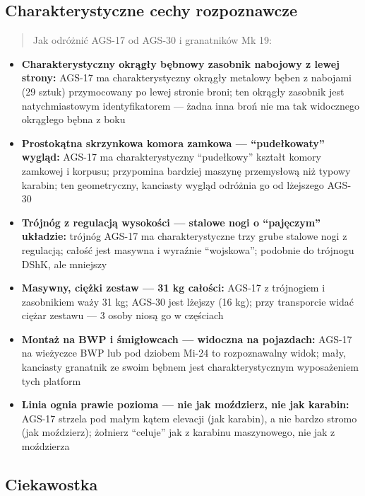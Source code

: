 \documentclass[12pt,oneside]{book}
\providecommand{\tightlist}{%
  \setlength{\itemsep}{0pt}\setlength{\parskip}{0pt}}
\begin{document}
\subsection{Charakterystyczne cechy
rozpoznawcze}\label{charakterystyczne-cechy-rozpoznawcze-97}

\begin{quote}
Jak odróżnić AGS-17 od AGS-30 i granatników Mk 19:
\end{quote}

\begin{itemize}
\tightlist
\item
  \textbf{Charakterystyczny okrągły bębnowy zasobnik nabojowy z lewej
  strony:} AGS-17 ma charakterystyczny okrągły metalowy bęben z nabojami
  (29 sztuk) przymocowany po lewej stronie broni; ten okrągły zasobnik
  jest natychmiastowym identyfikatorem --- żadna inna broń nie ma tak
  widocznego okrągłego bębna z boku
\item
  \textbf{Prostokątna skrzynkowa komora zamkowa --- ``pudełkowaty''
  wygląd:} AGS-17 ma charakterystyczny ``pudełkowy'' kształt komory
  zamkowej i korpusu; przypomina bardziej maszynę przemysłową niż typowy
  karabin; ten geometryczny, kanciasty wygląd odróżnia go od lżejszego
  AGS-30
\item
  \textbf{Trójnóg z regulacją wysokości --- stalowe nogi o ``pajęczym''
  układzie:} trójnóg AGS-17 ma charakterystyczne trzy grube stalowe nogi
  z regulacją; całość jest masywna i wyraźnie ``wojskowa''; podobnie do
  trójnogu DShK, ale mniejszy
\item
  \textbf{Masywny, ciężki zestaw --- 31 kg całości:} AGS-17 z trójnogiem
  i zasobnikiem waży 31 kg; AGS-30 jest lżejszy (16 kg); przy
  transporcie widać ciężar zestawu --- 3 osoby niosą go w częściach
\item
  \textbf{Montaż na BWP i śmigłowcach --- widoczna na pojazdach:} AGS-17
  na wieżyczce BWP lub pod dziobem Mi-24 to rozpoznawalny widok; mały,
  kanciasty granatnik ze swoim bębnem jest charakterystycznym
  wyposażeniem tych platform
\item
  \textbf{Linia ognia prawie pozioma --- nie jak moździerz, nie jak
  karabin:} AGS-17 strzela pod małym kątem elevacji (jak karabin), a nie
  bardzo stromo (jak moździerz); żołnierz ``celuje'' jak z karabinu
  maszynowego, nie jak z moździerza
\end{itemize}

\subsection{Ciekawostka}\label{ciekawostka-97}
\end{document}
